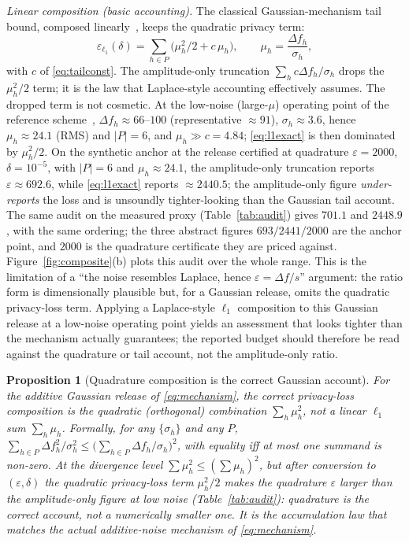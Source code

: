 \documentclass{ieeetj}
\theoremstyle{plain}
\newtheorem{proposition}{Proposition}
\theoremstyle{definition}
\begin{document}
\emph{Linear composition (basic accounting).} The classical Gaussian-mechanism
tail bound, composed linearly~\cite{dwork2014}, keeps the quadratic privacy
term:
\begin{equation}
\varepsilon_{\ell_1}(\delta)=\sum_{h\in P}\Big(\mu_h^{2}/2+c\,\mu_h\Big),
\qquad \mu_h=\frac{\Delta f_h}{\sigma_h},
\label{eq:l1exact}
\end{equation}
with $c$ of \eqref{eq:tailconst}. The amplitude-only truncation
$\sum_hc\Delta f_h/\sigma_h$ drops the $\mu_h^{2}/2$ term; it is the law that
Laplace-style accounting effectively assumes. The dropped term is not cosmetic.
At the low-noise (large-$\mu$) operating point of the reference
scheme~\cite{arXiv2510},
$\Delta f_h\approx66$--$100$ (representative $\approx91$), $\sigma_h\approx3.6$, hence $\mu_h\approx24.1$ (RMS) and
$|P|=6$, and $\mu_h\gg c=4.84$;
\eqref{eq:l1exact} is then dominated by $\mu_h^2/2$. On the
synthetic anchor at the release certified at quadrature $\varepsilon=2000$,
$\delta=10^{-5}$, with $|P|=6$ and $\mu_h\approx24.1$, the amplitude-only
truncation reports $\varepsilon\approx692.6$, while
\eqref{eq:l1exact} reports $\approx2440.5$; the amplitude-only figure
\emph{under-reports} the loss and is unsoundly tighter-looking than the Gaussian
tail account. The same audit on
the measured proxy (Table~\ref{tab:audit}) gives $701.1$ and $2448.9$, with the
same ordering; the three abstract figures $693/2441/2000$ are the anchor point,
and $2000$ is the quadrature certificate they are priced against.
Figure~\ref{fig:composite}(b) plots this audit over the whole range. This is
the limitation of a ``the noise resembles Laplace, hence
$\varepsilon=\Delta f/s$'' argument: the ratio form is dimensionally plausible
but, for a Gaussian release, omits the quadratic privacy-loss term. Applying a
Laplace-style $\ell_1$ composition to this
Gaussian release at a low-noise operating point yields an assessment that looks
tighter than the mechanism actually guarantees; the reported budget should
therefore be read against the quadrature or tail account, not the amplitude-only
ratio.

\begin{proposition}[Quadrature composition is the correct Gaussian account]
\label{pr:quadrature}
For the additive Gaussian release of \eqref{eq:mechanism}, the correct
privacy-loss composition is the quadratic (orthogonal) combination
$\sum_h\mu_h^{2}$, not a linear $\ell_1$ sum $\sum_h\mu_h$. Formally, for any
$\{\sigma_h\}$ and any $P$,
$\sum_{h\in P}\Delta f_h^{2}/\sigma_h^{2}
\le\big(\sum_{h\in P}\Delta f_h/\sigma_h\big)^{2}$, with equality iff at most
one summand is non-zero. At the divergence level $\sum\mu_h^2\le(\sum\mu_h)^2$, but after conversion to
$(\varepsilon,\delta)$ the quadratic privacy-loss term $\mu_h^2/2$ makes the
quadrature $\varepsilon$ larger than the amplitude-only figure at low noise
(Table~\ref{tab:audit}): quadrature is the \emph{correct} account, not a
numerically smaller one. It is the accumulation law that matches the actual
additive-noise mechanism of \eqref{eq:mechanism}.
\end{proposition}
\end{document}
